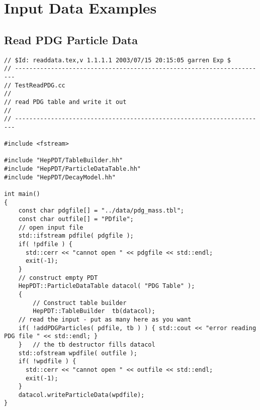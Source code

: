 \section { Input Data Examples}
\label{readdata}

\subsection { Read PDG Particle Data }
\begin{verbatim}
// $Id: readdata.tex,v 1.1.1.1 2003/07/15 20:15:05 garren Exp $
// ----------------------------------------------------------------------
// TestReadPDG.cc
//
// read PDG table and write it out
//
// ----------------------------------------------------------------------

#include <fstream>

#include "HepPDT/TableBuilder.hh"
#include "HepPDT/ParticleDataTable.hh"
#include "HepPDT/DecayModel.hh"

int main()
{
    const char pdgfile[] = "../data/pdg_mass.tbl";
    const char outfile[] = "PDfile";
    // open input file
    std::ifstream pdfile( pdgfile );
    if( !pdfile ) { 
      std::cerr << "cannot open " << pdgfile << std::endl;
      exit(-1);
    }
    // construct empty PDT
    HepPDT::ParticleDataTable datacol( "PDG Table" );
    {
        // Construct table builder
        HepPDT::TableBuilder  tb(datacol);
	// read the input - put as many here as you want
	if( !addPDGParticles( pdfile, tb ) ) { std::cout << "error reading PDG file " << std::endl; }
    }	// the tb destructor fills datacol
    std::ofstream wpdfile( outfile );
    if( !wpdfile ) { 
      std::cerr << "cannot open " << outfile << std::endl;
      exit(-1);
    }
    datacol.writeParticleData(wpdfile);
}
\end{verbatim}


